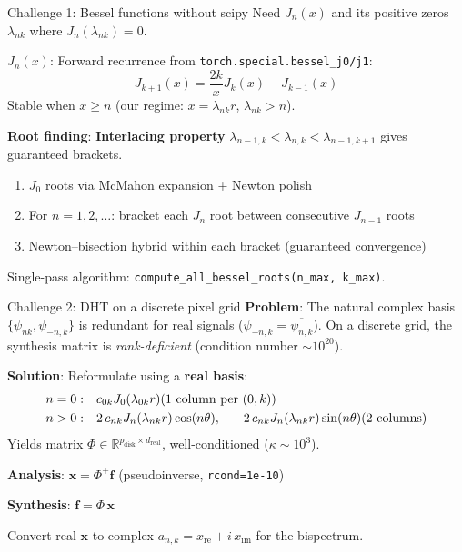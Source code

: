 \documentclass[aspectratio=169]{beamer}
\begin{document}
\begin{frame}{Challenge 1: Bessel functions without scipy}
  Need $J_n(x)$ and its positive zeros $\lambda_{nk}$ where $J_n(\lambda_{nk}) = 0$.

  \bigskip

  \textbf{$J_n(x)$}: Forward recurrence from \texttt{torch.special.bessel\_j0/j1}:
  \[
    J_{k+1}(x) = \frac{2k}{x} J_k(x) - J_{k-1}(x)
  \]
  Stable when $x \geq n$ (our regime: $x = \lambda_{nk} r$, $\lambda_{nk} > n$).

  \bigskip

  \textbf{Root finding}: \textbf{Interlacing property} $\lambda_{n-1,k} < \lambda_{n,k} < \lambda_{n-1,k+1}$ gives guaranteed brackets.

  \begin{enumerate}
    \item $J_0$ roots via McMahon expansion + Newton polish
    \item For $n = 1, 2, \ldots$: bracket each $J_n$ root between consecutive $J_{n-1}$ roots
    \item Newton--bisection hybrid within each bracket (guaranteed convergence)
  \end{enumerate}

  Single-pass algorithm: \texttt{compute\_all\_bessel\_roots(n\_max, k\_max)}.
\end{frame}

\begin{frame}{Challenge 2: DHT on a discrete pixel grid}
  \textbf{Problem}: The natural complex basis $\{\psi_{nk}, \psi_{-n,k}\}$ is redundant for real signals ($\psi_{-n,k} = \overline{\psi_{n,k}}$). On a discrete grid, the synthesis matrix is \emph{rank-deficient} (condition number $\sim 10^{20}$).

  \bigskip

  \textbf{Solution}: Reformulate using a \textbf{real basis}:
  \begin{align*}
    n = 0: &\quad c_{0k} J_0(\lambda_{0k} r) \hfill \text{(1 column per }(0,k)\text{)} \\
    n > 0: &\quad 2\,c_{nk} J_n(\lambda_{nk} r)\cos(n\theta),\quad -2\,c_{nk} J_n(\lambda_{nk} r)\sin(n\theta) \hfill \text{(2 columns)}
  \end{align*}
  Yields matrix $\Phi \in \mathbb{R}^{p_{\text{disk}} \times d_{\text{real}}}$, well-conditioned ($\kappa \sim 10^3$).

  \bigskip

  \textbf{Analysis}: $\mathbf{x} = \Phi^+ \mathbf{f}$ \quad (pseudoinverse, \texttt{rcond=1e-10})

  \textbf{Synthesis}: $\mathbf{f} = \Phi \, \mathbf{x}$

  \smallskip

  Convert real $\mathbf{x}$ to complex $a_{n,k} = x_{\text{re}} + i\,x_{\text{im}}$ for the bispectrum.
\end{frame}
\end{document}
